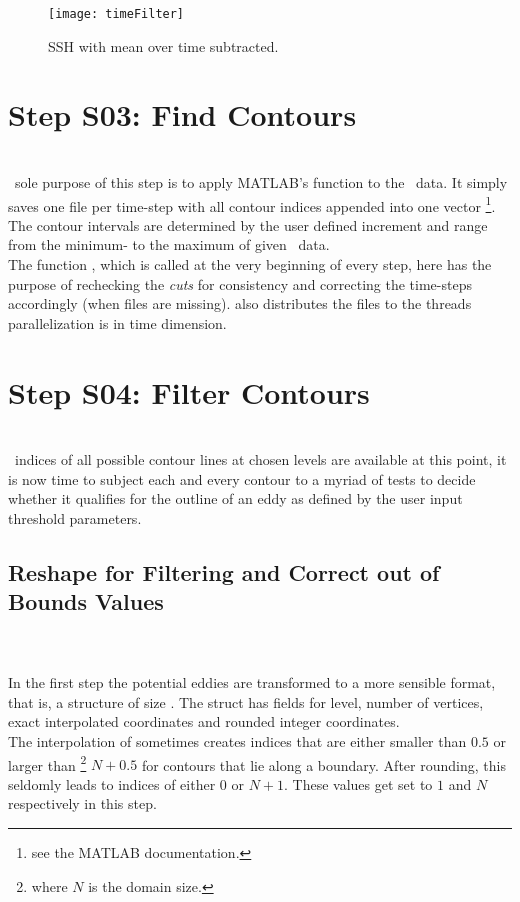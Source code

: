 \begin{figure*}
	\texttt{[image: timeFilter]}
	\caption{SSH with mean over time subtracted.}
	\label{fig:timeFilter}
\end{figure*}
 \section[Find Contours]{Step S03: Find Contours} \label{S:03}
\\
~sole purpose of this step is to apply MATLAB's  function
to the \SSH~data. It simply saves one file per time-step with all contour indices
appended into one vector \footnote{see the MATLAB documentation.}. The contour
intervals are determined by the user defined increment and range from the
minimum- to the maximum of given \SSH~data. \\
The function , which is called at the very beginning of
every step, here has the purpose of rechecking the \textit{cuts} for
consistency and correcting the time-steps accordingly (\ie when files are
missing).  also distributes the files to the threads \ie
parallelization is in time dimension.
\section[Filter Contours]{Step S04: Filter Contours} \label{S:04}
\\
~indices of all possible contour lines at chosen levels are available at
this point, it is now time to subject each and every contour to a
myriad of tests to decide whether it qualifies for the outline of an eddy as
defined by the user input threshold parameters.
\subsection{Reshape for Filtering and Correct out of Bounds Values}
\\
\noindent{}\\
In the first step the potential eddies are transformed to a more sensible
format, that is, a structure  of size . The struct has fields for level, number of
vertices, exact \ie interpolated coordinates and rounded integer coordinates.\\
The interpolation of  sometimes creates indices that are
either smaller than $0.5$ or larger than \footnote{where $N$ is the
domain size.} $N+0.5$ for contours that lie along a boundary. After rounding, this
seldomly leads to indices of either $0$ or $N+1$. These values get set to $1$
and $N$ respectively in this step.
